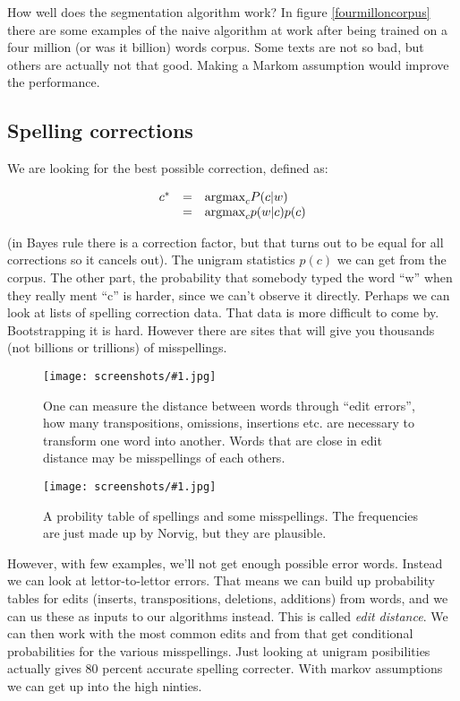 \documentclass[a4, 12pt, english, USenglish]{scrreprt}
\newcommand{\screenshot}[2]{
\begin{figure}[htb]
\texttt{[image: screenshots/\#1.jpg]}
\label{#1}
\caption{#2}
\end{figure}}
\newcommand{\idx}[1]{{\em #1}\index{#1}}
\begin{document}
How well does the segmentation algorithm work? In figure
\ref{fourmilloncorpus} there are some examples of the naive algorithm
at work after being trained on a four million (or was it billion)
words corpus.   Some texts are not so bad, but others are actually not
that good. Making a Markom assumption would improve the performance.


\subsection{Spelling corrections}

We are looking for the best possible correction, defined as:

\[
\begin{array}{lcl}
c^* &=& \mbox{argmax}_{c} P(c|w) \\
      &=& \mbox{argmax}_{c} p(w|c) p(c) 
\end{array}
\]

(in Bayes rule there is a correction factor, but that turns out to be
equal for all corrections so it cancels out).  The unigram statistics
\(p(c)\) we can get from the corpus.   The other part, the probability
that somebody typed the word ``w'' when they really ment ``c'' is
harder, since we can't observe it directly.  Perhaps we can look at
lists of spelling correction data.  That data is more difficult to
come by. Bootstrapping it is hard.  However there are sites that will
give you thousands (not billions or trillions) of misspellings.

\screenshot{editerrors}{One can measure the distance between words
  through ``edit errors'', how many transpositions, omissions,
  insertions etc. are necessary to transform one word into another.
  Words that are close in edit distance  may be misspellings of each others.}

\screenshot{spellingtable}{A probility table of spellings and some
  misspellings.  The frequencies are just made up by Norvig, but they
  are plausible.}

However, with few examples, we'll not get enough possible error
words. Instead we can look at lettor-to-lettor errors.  That means we
can build up probability tables for edits (inserts, transpositions,
deletions, additions) from words, and we can us these as inputs to our
algorithms instead. This is called \idx{edit distance}.  We can then
work with the most common edits and from that get conditional
probabilities for the various misspellings.  Just looking at unigram
posibilities actually gives 80 percent accurate spelling
correcter. With markov assumptions we can get up into the high
ninties.
\end{document}
